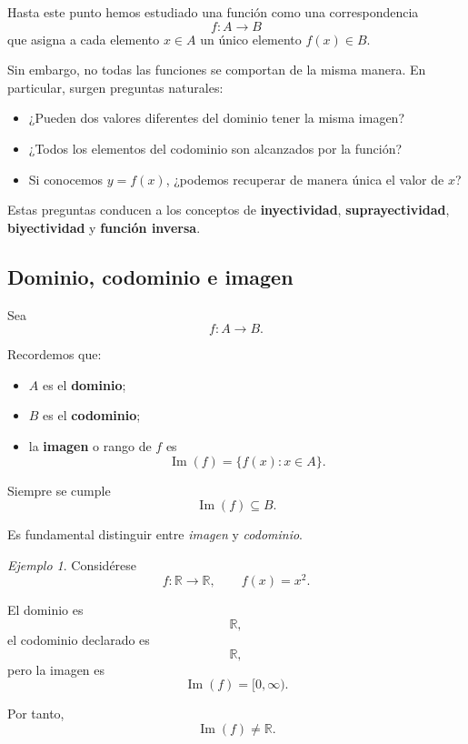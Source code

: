 \documentclass[12pt]{article}
\theoremstyle{remark}
\newtheorem{ejemplo}{Ejemplo}[section]
\begin{document}
Hasta este punto hemos estudiado una función como una correspondencia
\[
f:A\longrightarrow B
\]
que asigna a cada elemento \(x\in A\) un único elemento \(f(x)\in B\).

Sin embargo, no todas las funciones se comportan de la misma manera.
En particular, surgen preguntas naturales:

\begin{itemize}
    \item ¿Pueden dos valores diferentes del dominio tener la misma imagen?
    \item ¿Todos los elementos del codominio son alcanzados por la función?
    \item Si conocemos \(y=f(x)\), ¿podemos recuperar de manera única el valor de \(x\)?
\end{itemize}

Estas preguntas conducen a los conceptos de
\textbf{inyectividad}, \textbf{suprayectividad}, \textbf{biyectividad}
y \textbf{función inversa}.

\subsection{Dominio, codominio e imagen}

Sea
\[
f:A\longrightarrow B.
\]

Recordemos que:

\begin{itemize}
    \item \(A\) es el \textbf{dominio};
    \item \(B\) es el \textbf{codominio};
    \item la \textbf{imagen} o rango de \(f\) es
    \[
    \operatorname{Im}(f)
    =
    \{f(x):x\in A\}.
    \]
\end{itemize}

Siempre se cumple
\[
\operatorname{Im}(f)\subseteq B.
\]

Es fundamental distinguir entre \emph{imagen} y \emph{codominio}.

\begin{ejemplo}
Considérese
\[
f:\mathbb{R}\longrightarrow\mathbb{R},
\qquad
f(x)=x^2.
\]

El dominio es
\[
\mathbb{R},
\]
el codominio declarado es
\[
\mathbb{R},
\]
pero la imagen es
\[
\operatorname{Im}(f)=[0,\infty).
\]

Por tanto,
\[
\operatorname{Im}(f)\neq\mathbb{R}.
\]
\end{ejemplo}
\end{document}
